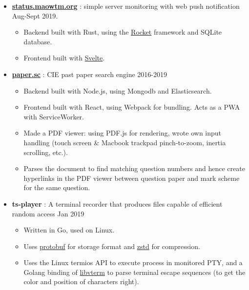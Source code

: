 \documentclass[a4paper]{article}
\begin{document}
  \begin{itemize}

    \item \href{https://status.maowtm.org}{\color{link}\textbf{status.maowtm.org}} : simple server monitoring with web push notification \dashdiv{} Aug-Sept 2019.

    \begin{itemize}
      \item Backend built with Rust, using the \href{https://rocket.rs}{\color{link}Rocket} framework and SQLite database.
      \item Frontend built with \href{https://svelte.dev/}{\color{link}Svelte}.
    \end{itemize}

    \item \href{https://paper.sc}{\color{link}\textbf{paper.sc}} : CIE past paper search engine \dashdiv{} 2016-2019

    \begin{itemize}
      \item Backend built with Node.js, using Mongodb and Elasticsearch.
      \item Frontend built with React, using Webpack for bundling. Acts as a PWA with ServiceWorker.
      \item Made a PDF viewer: using PDF.js for rendering, wrote own input handling (touch screen \& Macbook trackpad pinch-to-zoom, inertia scrolling, etc.).
      \item Parses the document to find matching question numbers and hence create hyperlinks in the PDF viewer between question paper and mark scheme for the same question.
    \end{itemize}

    \item \textbf{ts-player} : A terminal recorder that produces files capable of efficient random access \dashdiv{} Jan 2019

    \begin{itemize}
      \item Written in Go, used on Linux.
      \item Uses \href{https://developers.google.com/protocol-buffers}{\color{link}protobuf} for storage format and \href{https://facebook.github.io/zstd/}{\color{link}zstd} for compression.
      \item Uses the Linux termios API to execute process in monitored PTY, and a Golang binding of \href{http://www.leonerd.org.uk/code/libvterm/}{\color{link}libvterm} to parse terminal escape sequences (to get the color and position of characters right).
    \end{itemize}


\end{itemize}
\end{document}
